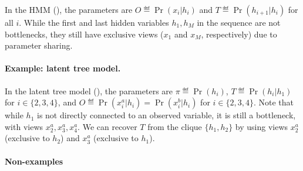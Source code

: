 In the HMM (), the parameters
are $O \eqdef \Pr(x_i|h_i)$ and $T \eqdef \Pr(h_{i+1} | h_i)$
for all $i$. %
While the first and last hidden variables $h_1, h_M$ in the
  sequence are not bottlenecks, they still have exclusive views ($x_1$ and
  $x_M$, respectively)
  due to parameter sharing.

\paragraph{Example: latent tree model.}

In the latent tree model (), the parameters
are $\pi \eqdef \Pr(h_i)$, $T \eqdef \Pr(h_i | h_1)$ for $i \in \{2,3,4\}$,
and $O \eqdef \Pr(x^a_i | h_i) = \Pr(x^b_i | h_i)$ for $i \in \{2,3,4\}$.
Note that while $h_1$ is not directly connected to an observed variable,
  it is still a bottleneck, with views $x^a_2, x^a_3, x^a_4$.
We can recover $T$ from the clique $\{h_1, h_2\}$ by using views $x^a_2$
  (exclusive to $h_2$) and $x^a_3$ (exclusive to $h_1$).


\paragraph{Non-examples}
\label{sec:non-example}

